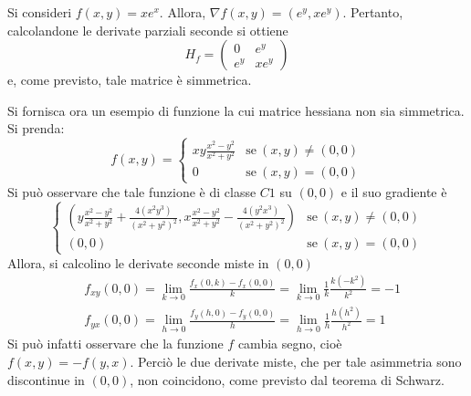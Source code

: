     \begin{example}
        Si consideri $f(x, y)=x e^x$. Allora, $\nabla f(x,y)=(e^y, xe^y)$.
        Pertanto, calcolandone le derivate parziali seconde si ottiene
        \begin{equation*}
            H_f=\begin{pmatrix}
                0 &e^y\\
                e^y &xe^y
            \end{pmatrix}
        \end{equation*}
        e, come previsto, tale matrice è simmetrica.
    \end{example}
    \begin{example}
        Si fornisca ora un esempio di funzione la cui matrice hessiana non sia simmetrica.\\
        Si prenda:
        \begin{equation*}
            f(x,y)=\begin{cases}
                xy \frac{x^2-y^2}{x^2+y^2} &\text{se}\ (x,y)\neq (0,0)\\
                0 &\text{se}\ (x,y)=(0,0)
            \end{cases}
        \end{equation*}
        Si può osservare che tale funzione è di classe $C1$ su $(0,0)$ e il suo gradiente è
        \begin{equation*}
            \begin{cases}
                \left(y \frac{x^2-y^2}{x^2+y^2}+\frac{4(x^2y^3)}{(x^2+y^2)^2},x \frac{x^2-y^2}{x^2+y^2}-\frac{4(y^2x^3)}{(x^2+y^2)^2}\right) &\text{se}\ (x,y)\neq(0,0)\\
                (0,0) &\text{se}\ (x,y)=(0,0)
            \end{cases}
        \end{equation*}
        Allora, si calcolino le derivate seconde miste in $(0,0)$
        \begin{equation*}
            \begin{aligned}
                &f_{xy}(0,0)=\lim_{k \to 0}\frac{f_x(0,k)-f_x(0,0)}{k}= \lim_{k\to 0}{\frac{1}{k} \frac{k(-k^2)}{k^2}}=-1\\
                &f_{yx}(0,0)=\lim_{h \to 0} \frac{f_y(h,0)-f_y(0,0)}{h}=\lim_{h \to 0}{\frac{1}{h} \frac{h(h^2)}{h^2}}=1
            \end{aligned}
        \end{equation*}
        Si può infatti osservare che la funzione $f$ cambia segno, cioè $f(x,y)=-f(y,x)$. Perciò le due derivate miste, che per tale asimmetria sono discontinue in $(0,0)$, non coincidono, come previsto dal teorema di Schwarz.
    \end{example}
